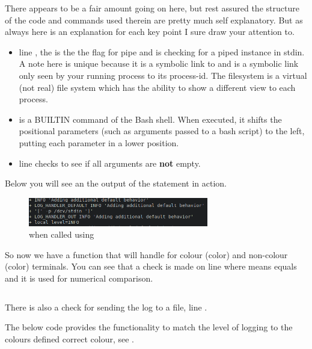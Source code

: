 \documentclass{article}
\begin{document}
\inputminted[frame=single,firstline=121,lastline=142,linenos]{bash}{rfclogger.sh}

There appears to be a fair amount going on here, but rest assured the structure of the code and commands used therein are pretty much self explanatory. But as always here is an explanation for each key point I sure draw your attention to.

\begin{itemize}
    \item line , the  is the the flag for pipe and is checking for a piped instance in stdin. A note here  is unique because it is a symbolic link to  and  is a symbolic link only seen by your running process to its process-id. The  filesystem is a virtual (not real) file system which has the ability to show a different view to each process.
    \item {} is a BUILTIN command of the Bash shell. When executed, it shifts the positional parameters (such as arguments passed to a bash script) to the left, putting each parameter in a lower position.
    \item line  checks to see if all arguments are \textbf{not}  empty.
\end{itemize}


Below you will see an the output of the  statement in action. 

\begin{figure}[H]
    \centering
    \includegraphics[width=0.7\textwidth]{images/log_handler_defualt_pipe.PNG}
    \caption{ when called using  }
\end{figure}

So now we have a function that will handle for colour (color) and non-colour (color) terminals.
You can see that a check is made on line  where  means equals and it is used for numerical comparison. 

\inputminted[frame=single,firstline=144,lastline=157,linenos]{bash}{rfclogger.sh}

There is also a check for sending the log to a file, line .

The below code provides the functionality to match the level of logging to the colours defined correct colour, see . 
\end{document}
